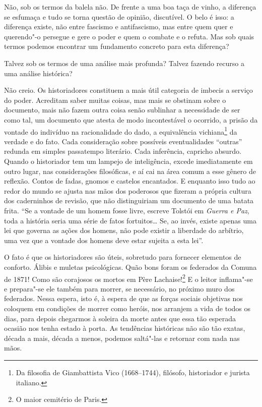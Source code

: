 Não, sob os termos da balela não. De frente a uma boa taça de vinho, a
diferença se esfumaça e tudo se torna questão de opinião, discutível. O
belo é isso: a diferença existe, não entre fascismo e antifascismo, mas
entre quem quer e querendo"-o persegue e gere o poder e quem o combate e
o refuta. Mas sob quais termos podemos encontrar um fundamento concreto
para esta diferença?

Talvez sob os termos de uma análise mais profunda? Talvez fazendo
recurso a uma análise histórica?

Não creio. Os historiadores constituem a mais útil categoria de imbecis
a serviço do poder. Acreditam saber muitas coisas, mas mais se obstinam
sobre o documento, mais não fazem outra coisa senão sublinhar a
necessidade de ser como tal, um documento que atesta de modo
incontestável o ocorrido, a prisão da vontade do indivíduo na
racionalidade do dado, a equivalência vichiana\footnote{Da filosofia de Giambattista Vico (1668--1744), filósofo,
  historiador e jurista italiano.} da verdade e do fato. Cada consideração sobre possíveis
eventualidades ``outras'' redunda em simples passatempo literário. Cada
inferência, capricho absurdo. Quando o historiador tem um lampejo de
inteligência, excede imediatamente em outro lugar, nas considerações
filosóficas, e aí cai na área comum a esse gênero de reflexão. Contos de
fadas, gnomos e castelos encantados. E enquanto isso tudo ao redor do
mundo se ajusta nas mãos dos poderosos que fizeram a própria cultura dos
caderninhos de revisão, que não distinguiriam um documento de uma batata
frita. ``Se a vontade de um homem fosse livre, escreve Tolstói em
\emph{Guerra e Paz}, toda a história seria uma série de fatos
fortuitos\ldots{} Se, ao invés, existe apenas uma lei que governa as ações
dos homens, não pode existir a liberdade do arbítrio, uma vez que a
vontade dos homens deve estar sujeita a esta lei''.

O fato é que os historiadores são úteis, sobretudo para fornecer
elementos de conforto. Álibis e muletas psicológicas. Quão bons foram os
federados da Comuna de 1871! Como são corajosos os mortos em Père
Lachaise!\footnote{O maior cemitério de Paris.} E o leitor inflama"-se e prepara"-se ele também para
morrer, se necessário, no próximo muro dos federados. Nessa espera, isto
é, à espera de que as forças sociais objetivas nos coloquem em condições
de morrer como heróis, nos arranjem a vida de todos os dias, para depois
chegarmos à soleira da morte antes que essa tão esperada ocasião nos
tenha estado à porta. As tendências históricas não são tão exatas,
década a mais, década a menos, podemos saltá"-las e retornar com nada nas
mãos.

